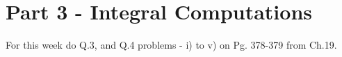 \documentclass[9pt, a4paper, oneside, reqno]{amsart}
\begin{document}
\begin{questions}[resume]
\end{questions}


\newpage
\section*{Part 3 - Integral Computations}
\begin{questions}[resume]
	\item For this week do Q.3, and Q.4 problems - i) to v) on Pg. 378-379 from Ch.19. \\\\

\end{questions}
\end{document}
